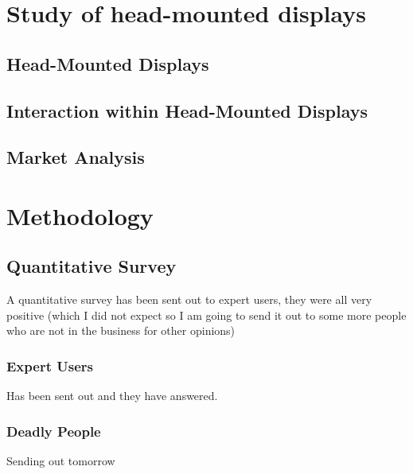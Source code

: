 \documentclass[a4paper,11pt,twoside]{report}
\begin{document}
\chapter{Study of head-mounted displays}
	
\section{Head-Mounted Displays}

\section{Interaction within Head-Mounted Displays}

\section{Market Analysis}


\chapter{Methodology}

\section{Quantitative Survey}
A quantitative survey has been sent out to expert users, they were all very positive (which I did not expect so I am going to send it out to some more people who are not in the business for other opinions)
		
\subsection{Expert Users}
Has been sent out and they have answered.
			
\subsection{Deadly People}
Sending out tomorrow
			
\end{document}
